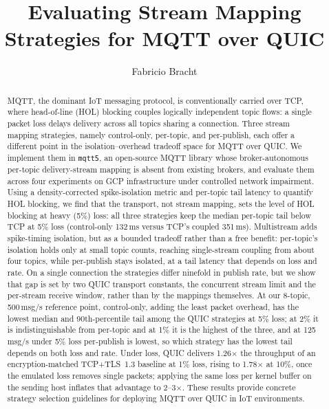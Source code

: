 \documentclass[a4paper,fleqn]{cas-dc}
\begin{document}
\let\WriteBookmarks\relax
\def\floatpagepagefraction{1}
\def\textpagefraction{.001}


\title[mode=title]{Evaluating Stream Mapping Strategies for MQTT over QUIC}

\author[1]{Fabricio Bracht}
\cormark[1]




\begin{abstract}
MQTT, the dominant IoT messaging protocol, is conventionally carried over TCP, where head-of-line (HOL) blocking couples logically independent topic flows: a single packet loss delays delivery across all topics sharing a connection. Three stream mapping strategies, namely control-only, per-topic, and per-publish, each offer a different point in the isolation--overhead tradeoff space for MQTT over QUIC. We implement them in \texttt{mqtt5}, an open-source MQTT library whose broker-autonomous per-topic delivery-stream mapping is absent from existing brokers, and evaluate them across four experiments on GCP infrastructure under controlled network impairment. Using a density-corrected spike-isolation metric and per-topic tail latency to quantify HOL blocking, we find that the transport, not stream mapping, sets the level of HOL blocking at heavy (5\%) loss: all three strategies keep the median per-topic tail below TCP at 5\% loss (control-only 132\,ms versus TCP's coupled 351\,ms). Multistream adds spike-timing isolation, but as a bounded tradeoff rather than a free benefit: per-topic's isolation holds only at small topic counts, reaching single-stream coupling from about four topics, while per-publish stays isolated, at a tail latency that depends on loss and rate. On a single connection the strategies differ ninefold in publish rate, but we show that gap is set by two QUIC transport constants, the concurrent stream limit and the per-stream receive window, rather than by the mappings themselves. At our 8-topic, 500\,msg/s reference point, control-only, adding the least packet overhead, has the lowest median and 90th-percentile tail among the QUIC strategies at 5\% loss; at 2\% it is indistinguishable from per-topic and at 1\% it is the highest of the three, and at 125\,msg/s under 5\% loss per-publish is lowest, so which strategy has the lowest tail depends on both loss and rate. Under loss, QUIC delivers 1.26$\times$ the throughput of an encryption-matched TCP+TLS~1.3 baseline at 1\% loss, rising to 1.78$\times$ at 10\%, once the emulated loss removes single packets; applying the same loss per kernel buffer on the sending host inflates that advantage to 2--3$\times$. These results provide concrete strategy selection guidelines for deploying MQTT over QUIC in IoT environments.
\end{abstract}
\end{document}
